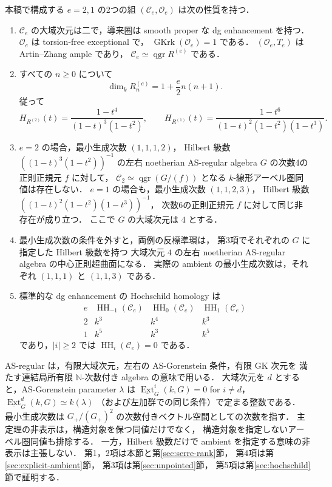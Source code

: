 \begin{theorem}
\label{thm:weighted-main}
本稿で構成する $e=2,1$ の2つの組
$(\mathcal C_e,\mathcal O_e)$ は次の性質を持つ．
\begin{enumerate}
\item $\mathcal C_e$ の大域次元は二で，導来圏は smooth proper な
dg enhancement を持つ．$\mathcal O_e$ は torsion-free exceptional で，
$\operatorname{GKrk}(\mathcal O_e)=1$ である．
$(\mathcal O_e,T_e)$ は Artin--Zhang ample であり，
$\mathcal C_e\simeq\operatorname{qgr}R^{(e)}$ である．
\item すべての $n\ge0$ について
\[
 \dim_k R^{(e)}_n=1+\frac e2 n(n+1).
\]
従って
\[
 H_{R^{(2)}}(t)=\frac{1-t^4}{(1-t)^3(1-t^2)},\qquad
 H_{R^{(1)}}(t)=\frac{1-t^6}{(1-t)^2(1-t^2)(1-t^3)}.
\]
\item $e=2$ の場合，最小生成次数 $(1,1,1,2)$，
Hilbert 級数 $((1-t)^3(1-t^2))^{-1}$ の左右 noetherian
AS-regular algebra $G$ の次数4の正則正規元 $f$ に対して，
$\mathcal C_2\simeq\operatorname{qgr}(G/(f))$ となる
$k$-線形アーベル圏同値は存在しない．
$e=1$ の場合も，最小生成次数 $(1,1,2,3)$，
Hilbert 級数 $((1-t)^2(1-t^2)(1-t^3))^{-1}$，
次数6の正則正規元 $f$ に対して同じ非存在が成り立つ．
ここで $G$ の大域次元は $4$ とする．
\item 最小生成次数の条件を外すと，両例の反標準環は，
第3項でそれぞれの $G$ に指定した Hilbert 級数を持つ
大域次元 $4$ の左右 noetherian AS-regular algebra の中心正則超曲面になる．
実際の ambient の最小生成次数は，それぞれ $(1,1,1)$ と $(1,1,3)$ である．
\item 標準的な dg enhancement の Hochschild homology は
\[
\begin{array}{c|ccc}
e&\operatorname{HH}_{-1}(\mathcal C_e)&
\operatorname{HH}_0(\mathcal C_e)&\operatorname{HH}_1(\mathcal C_e)\\ \hline
2&k^3&k^4&k^3\\
1&k^5&k^3&k^5
\end{array}
\]
であり，$|i|\ge2$ では $\operatorname{HH}_i(\mathcal C_e)=0$ である．
\end{enumerate}
\end{theorem}

AS-regular は，有限大域次元，左右の AS-Gorenstein 条件，有限 GK 次元を
満たす連結局所有限 $\mathbb N$-次数付き algebra の意味で用いる．
大域次元を $d$ とすると，AS-Gorenstein parameter $\lambda$ は
$\underline{\operatorname{Ext}}^i_G(k,G)=0$ for $i\ne d$，
$\underline{\operatorname{Ext}}^d_G(k,G)\simeq k(\lambda)$
（および左加群での同じ条件）で定まる整数である．
最小生成次数は $G_+/(G_+)^2$ の次数付きベクトル空間としての次数を指す．
主定理の非表示は，構造対象を保つ同値だけでなく，
構造対象を指定しないアーベル圏同値も排除する．
一方，Hilbert 級数だけで ambient を指定する意味の非表示は主張しない．
第1，2項は本節と第\ref{sec:serre-rank}節，
第4項は第\ref{sec:explicit-ambient}節，
第3項は第\ref{sec:unpointed}節，
第5項は第\ref{sec:hochschild}節で証明する．

